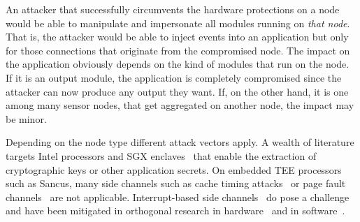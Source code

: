 An attacker that successfully circumvents the hardware protections on a node
would be able to manipulate and impersonate all modules running on \emph{that
node}.  That is, the attacker would be able to inject events into an application
but only for those connections that originate from the compromised node.  The
impact on the application obviously depends on the kind of modules that run on
the node.  If it is an output module, the application is completely compromised
since the attacker can now produce any output they want.  If, on the other hand,
it is one among many sensor nodes, that get aggregated on another node, the
impact may be minor.

Depending on the node type different attack vectors apply. A wealth of
literature targets Intel processors and SGX enclaves~\cite{brasser2017software,
gotzfried2017cache, weisse2018foreshadow, van2018foreshadow, van2020sgaxe} that
enable the extraction of cryptographic keys or other application secrets. On
embedded \ac{TEE} processors such as Sancus, many side channels such as cache
timing attacks~\cite{cache-side-channels-practical,
practical-timing-side-channel-aslr} or page fault
channels~\cite{controlled-channel-attacks} are not applicable. Interrupt-based
side channels~\cite{van2018nemesis} do pose a challenge and have been mitigated
in orthogonal research in hardware~\cite{busi_2021securing} and in
software~\cite{winderix_2021_nemesis_def}.

